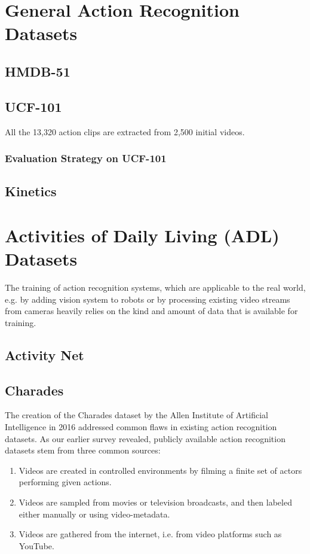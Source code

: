 \section{General Action Recognition Datasets}

\subsection{HMDB-51}

\subsection{UCF-101}

All the 13,320 action clips are extracted from 2,500 initial videos.

\subsubsection{Evaluation Strategy on UCF-101}

\subsection{Kinetics}


\section{Activities of Daily Living (ADL) Datasets}
The training of action recognition systems, which are applicable to the real world, e.g. by adding vision system to robots or by processing existing video streams from cameras heavily relies on the kind and amount of data that is available for training.

\subsection{Activity Net}

\subsection{Charades}

The creation of the Charades dataset \cite{sigurdsson_hollywood_2016} by the Allen Institute of Artificial Intelligence in 2016 addressed common flaws in existing action recognition datasets.
As our earlier survey revealed, publicly available action recognition datasets stem from three common sources:
\begin{enumerate}
    \item Videos are created in controlled environments by filming a finite set of actors performing given actions.
    \item Videos are sampled from movies or television broadcasts, and then labeled either manually or using video-metadata.
    \item Videos are gathered from the internet, i.e. from video platforms such as YouTube.
\end{enumerate}

